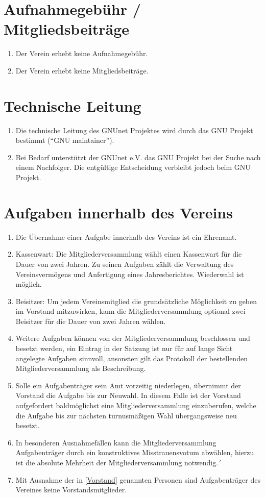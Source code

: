 \documentclass[german,a4paper]{article} %
\newenvironment{enumpar}{%
  \renewcommand{\labelenumi}{\theenumi}%
  \renewcommand{\theenumi}{(\arabic{enumi})}%
  \renewcommand{\labelenumii}{\theenumii}%
  \renewcommand{\theenumii}{(\alph{enumii})}%
  \begin{enumerate}}
{\end{enumerate}}
\begin{document}
\section{Aufnahmegebühr / Mitgliedsbeiträge}
\begin{enumpar}
\item Der Verein erhebt keine Aufnahmegebühr.
\item Der Verein erhebt keine Mitgliedsbeiträge.
\end{enumpar}

\section{Technische Leitung}\label{sec:tl}
\begin{enumpar}
\item Die technische Leitung des GNUnet Projektes wird durch das GNU Projekt bestimmt (``GNU maintainer'').
\item Bei Bedarf unterst\"utzt der GNUnet e.V. das GNU Projekt bei der Suche nach einem Nachfolger.  Die entg\"ultige Entscheidung verbleibt jedoch beim GNU Projekt.
\end{enumpar}

\section{Aufgaben innerhalb des Vereins}
\label{Aufgaben}
\begin{enumpar}
\item Die Übernahme einer Aufgabe innerhalb des Vereins ist ein Ehrenamt.
\item \label{Kassenwart}Kassenwart: Die Mitgliederversammlung wählt einen Kassenwart für die Dauer von zwei Jahren. Zu seinen Aufgaben zählt die Verwaltung des Vereinsvermögens und Anfertigung eines Jahresberichtes. Wiederwahl ist möglich.
\item Beisitzer: Um jedem Vereinsmitglied die grundsätzliche Möglichkeit zu geben im Vorstand mitzuwirken, kann die Mitgliederversammlung optional zwei Beisitzer für die Dauer von zwei Jahren w\"ahlen.
\item Weitere Aufgaben können von der Mitgliederversammlung beschlossen und besetzt werden, ein Eintrag in der Satzung ist nur für auf lange Sicht angelegte Aufgaben sinnvoll, ansonsten gilt das Protokoll der bestellenden Mitgliederversammlung als Beschreibung.
\item Solle ein Aufgabenträger sein Amt vorzeitig niederlegen, übernimmt der Vorstand die Aufgabe bis zur Neuwahl. In diesem Falle ist der Vorstand aufgefordert baldmöglichst eine Mitgliederversammlung einzuberufen, welche die Aufgabe bis zur nächsten turnusmäßigen Wahl übergangsweise neu besetzt.
\item In besonderen Ausnahmefällen kann die Mitgliederversammlung Aufgabenträger durch ein konstruktives Misstrauensvotum abwählen, hierzu ist die absolute Mehrheit der Mitgliederversammlung notwendig.´
\item Mit Ausnahme der in \ref{Vorstand} genannten Personen sind Aufgabenträger des Vereines keine Vorstandsmitglieder.
\end{enumpar}
\end{document}
